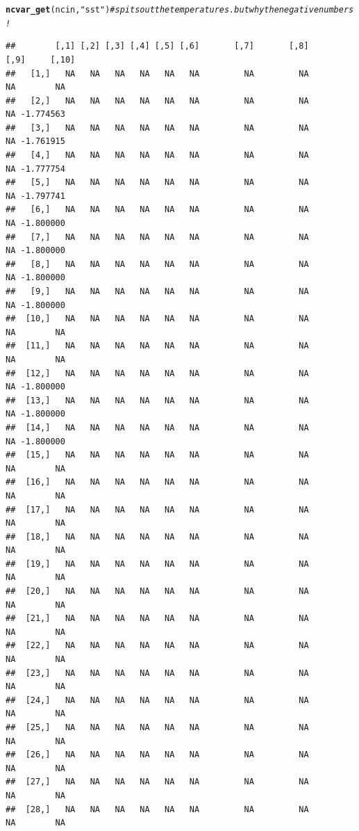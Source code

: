 \documentclass{article}\usepackage[]{graphicx}\usepackage[]{color}
\makeatletter
\newcommand{\hlstr}[1]{\textcolor[rgb]{0.192,0.494,0.8}{#1}}%
\newcommand{\hlcom}[1]{\textcolor[rgb]{0.678,0.584,0.686}{\textit{#1}}}%
\newcommand{\hlstd}[1]{\textcolor[rgb]{0.345,0.345,0.345}{#1}}%
\newcommand{\hlkwd}[1]{\textcolor[rgb]{0.737,0.353,0.396}{\textbf{#1}}}%
\newenvironment{kframe}{%
 \def\at@end@of@kframe{}%
 \ifinner\ifhmode%
  \def\at@end@of@kframe{\end{minipage}}%
  \begin{minipage}{\columnwidth}%
 \fi\fi%
 \def\FrameCommand##1{\hskip\@totalleftmargin \hskip-\fboxsep
 \colorbox{shadecolor}{##1}\hskip-\fboxsep
     \hskip-\linewidth \hskip-\@totalleftmargin \hskip\columnwidth}%
 \MakeFramed {\advance\hsize-\width
   \@totalleftmargin\z@ \linewidth\hsize
   \@setminipage}}%
 {\par\unskip\endMakeFramed%
 \at@end@of@kframe}
\newenvironment{knitrout}{}{} %
\makeatother
\begin{document}
\begin{knitrout}
\begin{kframe}
\begin{alltt}
\hlkwd{ncvar_get}\hlstd{(ncin,} \hlstr{"sst"}\hlstd{)} \hlcom{#spits out the temperatures. but why the negative numbers!}
\end{alltt}
\begin{verbatim}
##        [,1] [,2] [,3] [,4] [,5] [,6]       [,7]       [,8]       [,9]     [,10]
##   [1,]   NA   NA   NA   NA   NA   NA         NA         NA         NA        NA
##   [2,]   NA   NA   NA   NA   NA   NA         NA         NA         NA -1.774563
##   [3,]   NA   NA   NA   NA   NA   NA         NA         NA         NA -1.761915
##   [4,]   NA   NA   NA   NA   NA   NA         NA         NA         NA -1.777754
##   [5,]   NA   NA   NA   NA   NA   NA         NA         NA         NA -1.797741
##   [6,]   NA   NA   NA   NA   NA   NA         NA         NA         NA -1.800000
##   [7,]   NA   NA   NA   NA   NA   NA         NA         NA         NA -1.800000
##   [8,]   NA   NA   NA   NA   NA   NA         NA         NA         NA -1.800000
##   [9,]   NA   NA   NA   NA   NA   NA         NA         NA         NA -1.800000
##  [10,]   NA   NA   NA   NA   NA   NA         NA         NA         NA        NA
##  [11,]   NA   NA   NA   NA   NA   NA         NA         NA         NA        NA
##  [12,]   NA   NA   NA   NA   NA   NA         NA         NA         NA -1.800000
##  [13,]   NA   NA   NA   NA   NA   NA         NA         NA         NA -1.800000
##  [14,]   NA   NA   NA   NA   NA   NA         NA         NA         NA -1.800000
##  [15,]   NA   NA   NA   NA   NA   NA         NA         NA         NA        NA
##  [16,]   NA   NA   NA   NA   NA   NA         NA         NA         NA        NA
##  [17,]   NA   NA   NA   NA   NA   NA         NA         NA         NA        NA
##  [18,]   NA   NA   NA   NA   NA   NA         NA         NA         NA        NA
##  [19,]   NA   NA   NA   NA   NA   NA         NA         NA         NA        NA
##  [20,]   NA   NA   NA   NA   NA   NA         NA         NA         NA        NA
##  [21,]   NA   NA   NA   NA   NA   NA         NA         NA         NA        NA
##  [22,]   NA   NA   NA   NA   NA   NA         NA         NA         NA        NA
##  [23,]   NA   NA   NA   NA   NA   NA         NA         NA         NA        NA
##  [24,]   NA   NA   NA   NA   NA   NA         NA         NA         NA        NA
##  [25,]   NA   NA   NA   NA   NA   NA         NA         NA         NA        NA
##  [26,]   NA   NA   NA   NA   NA   NA         NA         NA         NA        NA
##  [27,]   NA   NA   NA   NA   NA   NA         NA         NA         NA        NA
##  [28,]   NA   NA   NA   NA   NA   NA         NA         NA         NA        NA

\end{verbatim}
\end{kframe}
\end{knitrout}
\end{document}

